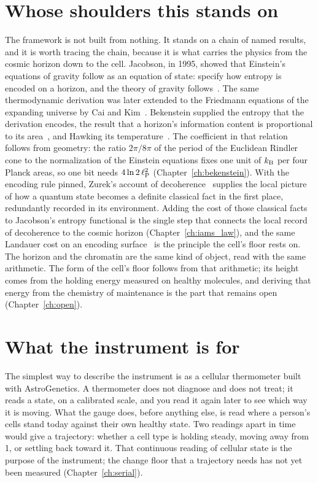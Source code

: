 \section{Whose shoulders this stands on}\label{sec:ag_lineage}

The framework is not built from nothing. It stands on a chain of named results, and it is worth tracing the chain, because it is what
carries the physics from the cosmic horizon down to the cell. Jacobson, in 1995, showed that Einstein's equations of gravity follow as an
equation of state: specify how entropy is encoded on a horizon, and the theory of gravity follows~\cite{Jacobson1995}. The same
thermodynamic derivation was later extended to the Friedmann equations of the expanding universe by Cai and Kim~\cite{CaiKim2005}.
Bekenstein supplied the entropy that the derivation encodes, the result that a horizon's information content is proportional to its
area~\cite{Bekenstein1973}, and Hawking its temperature~\cite{Hawking1975}. The coefficient in that relation follows from geometry: the
ratio $2\pi/8\pi$ of the period of the Euclidean Rindler cone to the normalization of the Einstein equations fixes one unit of $k_{\mathrm B}$ per
four Planck areas, so one bit needs $4\ln2\,\ell_{\mathrm P}^2$ (Chapter~\ref{ch:bekenstein}). \derived{} With the encoding rule pinned, Zurek's account
of decoherence~\cite{Zurek2003} supplies the local picture of how a quantum state becomes a definite classical fact in the first place,
redundantly recorded in its environment. Adding the cost of those classical facts to Jacobson's entropy functional is the single step
that connects the local record of decoherence to the cosmic horizon (Chapter~\ref{ch:iams_law}), and the same Landauer cost on an encoding
surface~\cite{Landauer1961} is the principle the cell's floor rests on. The horizon and the chromatin are the same kind of object, read
with the same arithmetic. \conjecture{} The form of the cell's floor follows from that arithmetic; its height comes from the holding energy
measured on healthy molecules, and deriving that energy from the chemistry of maintenance is the part that remains open
(Chapter~\ref{ch:open}). \openprob

\section{What the instrument is for}\label{sec:ag_for}

The simplest way to describe the instrument is as a cellular thermometer built with AstroGenetics. A thermometer does not diagnose and
does not treat; it reads a state, on a calibrated scale, and you read it again later to see which way it is moving. What the gauge does,
before anything else, is read where a person's cells stand today against their own healthy state. Two readings apart in time would give a
trajectory: whether a cell type is holding steady, moving away from 1, or settling back toward it. That continuous reading of cellular
state is the purpose of the instrument; the change floor that a trajectory needs has not yet been measured (Chapter~\ref{ch:serial}).
\openprob

